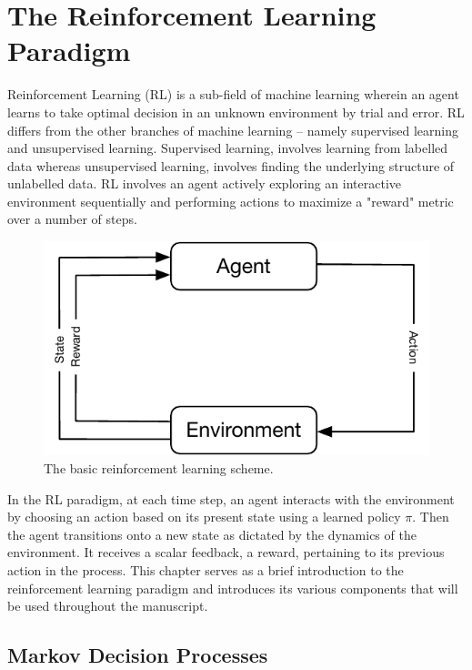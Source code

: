 \normallinespacing

\chapter{The Reinforcement Learning Paradigm}

Reinforcement Learning (RL) is a sub-field of machine learning wherein an agent learns to take optimal decision in an unknown environment by trial and error.
RL differs from the other branches of machine learning -- namely supervised learning and unsupervised learning.
Supervised learning, involves learning from labelled data whereas unsupervised learning, involves finding the underlying structure of unlabelled data.
RL involves an agent actively exploring an interactive environment sequentially and
performing actions to maximize a "reward" metric over a number of steps.

\begin{figure}[!htbp]
    \centering
    \includegraphics{rl/rl_scheme.pdf}
    \caption{The basic reinforcement learning scheme.}
    \label{fig:rl_scheme}
\end{figure}

In the RL paradigm, at each time step, an agent interacts with the environment by choosing an action based on its present state using a learned policy $\pi$.
Then the agent transitions onto a new state as dictated by the dynamics of the environment.
It receives a scalar feedback, a reward, pertaining to its previous action in the process.
This chapter serves as a brief introduction to the reinforcement learning paradigm and introduces its various components that will be used throughout the manuscript.

\section{Markov Decision Processes}

